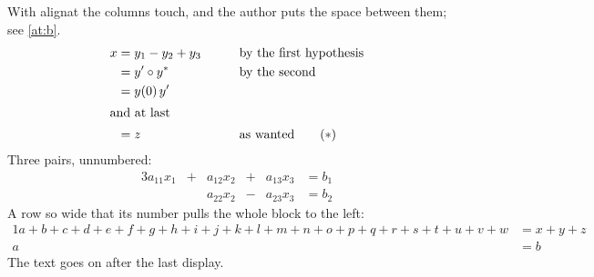 \documentclass{article}
\begin{document}
With alignat the columns touch, and the author puts the space between them; see \eqref{at:b}.
\begin{alignat}{2}
x &= y_1 - y_2 + y_3 &\qquad& \text{by the first hypothesis} \\
  &= y' \circ y^* && \text{by the second} \label{at:b} \\
  &= y(0)\, y' \notag \\
\intertext{and at last}
  &= z && \text{as wanted} \tag{$\ast$}
\end{alignat}
Three pairs, unnumbered:
\begin{alignat*}{3}
a_{11} x_1 &{}+{}& a_{12} x_2 &{}+{}& a_{13} x_3 &= b_1 \\
           &    & a_{22} x_2 &{}-{}& a_{23} x_3 &= b_2
\end{alignat*}
A row so wide that its number pulls the whole block to the left:
\begin{alignat}{1}
a + b + c + d + e + f + g + h + i + j + k + l + m + n + o + p + q + r + s + t + u + v + w &= x + y + z \\
a &= b
\end{alignat}
The text goes on after the last display.
\end{document}
